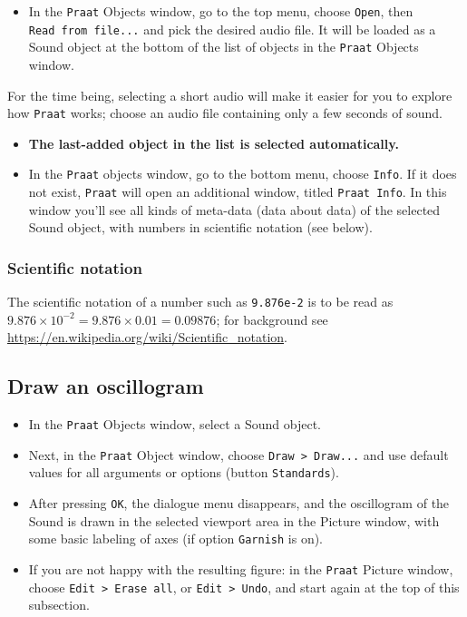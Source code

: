 \documentclass[
]{book}
\providecommand{\tightlist}{%
  \setlength{\itemsep}{0pt}\setlength{\parskip}{0pt}}
\begin{document}
\begin{itemize}
\tightlist
\item
  In the \texttt{Praat} Objects window, go to the top menu, choose \texttt{Open}, then \texttt{Read\ from\ file...} and pick the desired audio file. It will be loaded as a Sound object at the bottom of the list of objects in the \texttt{Praat} Objects window.
\end{itemize}

For the time being, selecting a short audio will make it easier for you to explore how \texttt{Praat} works; choose an audio file containing only a few seconds of sound.

\begin{itemize}
\item
  \textbf{The last-added object in the list is selected automatically.}
\item
  In the \texttt{Praat} objects window, go to the bottom menu, choose \texttt{Info}. If it does not exist, \texttt{Praat} will open an additional window, titled \texttt{Praat\ Info}. In this window you'll see all kinds of meta-data (data about data) of the selected Sound object, with numbers in scientific notation (see below).
\end{itemize}

\protect{}\label{scientificnotation}
\subsubsection{Scientific notation}\label{sec:scientificnotation}

The scientific notation of a number such as \texttt{9.876e-2} is to be read as \(9.876 \times 10^{-2} = 9.876 \times 0.01 = 0.09876\); for background see \url{https://en.wikipedia.org/wiki/Scientific_notation}.

\protect{}\label{box-draw}
\subsection{Draw an oscillogram}\label{draw-an-oscillogram}

\begin{itemize}
\item
  In the \texttt{Praat} Objects window, select a Sound object.
\item
  Next, in the \texttt{Praat} Object window, choose \texttt{Draw\ \textgreater{}\ Draw...} and use default values for all arguments or options (button \texttt{Standards}).
\item
  After pressing \texttt{OK}, the dialogue menu disappears, and the oscillogram of the Sound is drawn in the selected viewport area in the Picture window, with some basic labeling of axes (if option \texttt{Garnish} is on).
\item
  If you are not happy with the resulting figure: in the \texttt{Praat} Picture window, choose \texttt{Edit\ \textgreater{}\ Erase\ all}, or \texttt{Edit\ \textgreater{}\ Undo}, and start again at the top of this subsection.
\end{itemize}
\end{document}
